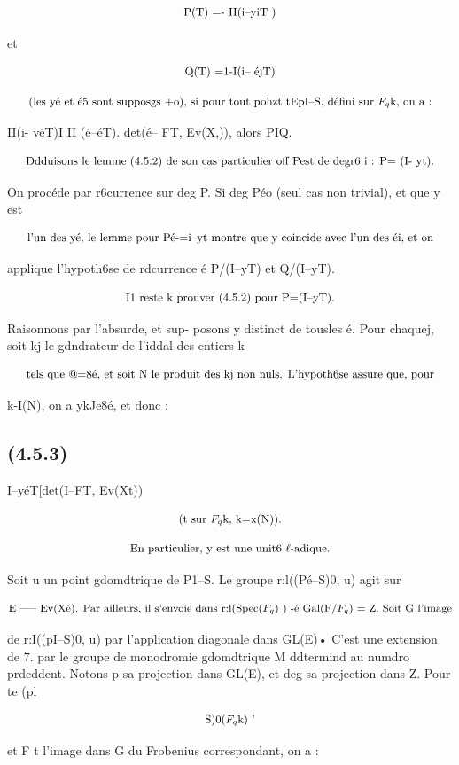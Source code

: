 \documentclass[11pt]{article}
\theoremstyle{remark}
\begin{document}
\[\text{\small P(T) =- II(i--yiT )}\]

et

\[\text{\small Q(T) =1-I(i-- éjT)}\]

\[\text{\small (les yé et é5 sont supposgs +o), si pour tout pohzt tEpI--S, défini sur \(F_q\)k, on a :}\]

II(i- véT)I II (é--éT). det(é-- FT, Ev(X,)), alors PIQ.

\[\text{\small Ddduisons le lemme (4.5.2) de son cas particulier off Pest de degr6 i : P= (I- yt).}\]

On procéde par r6currence sur deg P. Si deg Péo (seul cas non trivial), et que y est

\[\text{\small l'un des yé, le lemme pour Pé-=i--yt montre que y coincide avec l'un des éi, et on}\]

applique l'hypoth6se de rdcurrence é P/(I--yT) et Q/(I--yT).

\[\text{\small I1 reste k prouver (4.5.2) pour P=(I--yT).}\]

Raisonnons par l'absurde, et sup- posons y distinct de tousles é. Pour chaquej, soit kj le gdndrateur de l'iddal des entiers k

\[\text{\small tels que @=8é, et soit N le produit des kj non nuls. L'hypoth6se assure que, pour}\]

k-I(N), on a ykJe8é, et donc :

\subsection*{(4.5.3)}

I--yéT[det(I--FT, Ev(Xt))

\[\text{\small (t sur \(F_q\)k, k=x(N)).}\]

\[\text{\small En particulier, y est une unit6 \(\ell\)-adique.}\]

Soit u un point gdomdtrique de P1--S. Le groupe r:l((Pé--S)0, u) agit sur

\[\text{\small E ----- Ev(Xé). Par ailleurs, il s'envoie dans r:l(Spec(\(F_q\)) ) -é Gal(F/\(F_q\)) = Z. Soit G l'image}\]

de r:I((pI--S)0, u) par l'application diagonale dans GL(E)• C'est une extension de 7. par le groupe de monodromie gdomdtrique M ddtermind au numdro prdcddent. Notons p sa projection dans GL(E), et deg sa projection dans Z. Pour te (pl

\[\text{\small S)0(\(F_q\)k) '}\]

et F t l'image dans G du Frobenius correspondant, on a :
\end{document}
